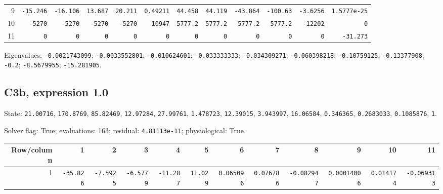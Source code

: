 \begin{landscape}
\begin{tabular}{rrrrrrrrrrrr}
9 & \texttt{-15.246} & \texttt{-16.106} & \texttt{13.687} & \texttt{20.211} & \texttt{0.49211} & \texttt{44.458} & \texttt{44.119} & \texttt{-43.864} & \texttt{-100.63} & \texttt{-3.6256} & \texttt{1.5777e-25} \\

10 & \texttt{-5270} & \texttt{-5270} & \texttt{-5270} & \texttt{-5270} & \texttt{10947} & \texttt{5777.2} & \texttt{5777.2} & \texttt{5777.2} & \texttt{5777.2} & \texttt{-12202} & \texttt{0} \\

11 & \texttt{0} & \texttt{0} & \texttt{0} & \texttt{0} & \texttt{0} & \texttt{0} & \texttt{0} & \texttt{0} & \texttt{0} & \texttt{0} & \texttt{-31.273} \\

\bottomrule\end{tabular}\par\endgroup

{\scriptsize Eigenvalues: \texttt{-0.0021743099}; \texttt{-0.0033552801}; \texttt{-0.010624601}; \texttt{-0.033333333}; \texttt{-0.034309271}; \texttt{-0.060398218}; \texttt{-0.10759125}; \texttt{-0.13377908}; \texttt{-0.2}; \texttt{-8.5679955}; \texttt{-15.281905}.\par}

\subsection*{C3b, expression 1.0}
{\scriptsize State: \texttt{21.00716}, \texttt{170.8769}, \texttt{85.82469}, \texttt{12.97284}, \texttt{27.99761}, \texttt{1.478723}, \texttt{12.39015}, \texttt{3.943997}, \texttt{16.06584}, \texttt{0.346365}, \texttt{0.2683033}, \texttt{0.1085876}, \texttt{1}.\par

Solver flag: True; evaluations: 163; residual: \texttt{4.81113e-11}; physiological: True.\par}

\begingroup\scriptsize\setlength{\tabcolsep}{3pt}\centering
\begin{tabular}{rrrrrrrrrrrr}\toprule

Row/column & 1 & 2 & 3 & 4 & 5 & 6 & 7 & 8 & 9 & 10 & 11 \\ \midrule

1 & \texttt{-35.826} & \texttt{-7.5925} & \texttt{-6.5779} & \texttt{-11.287} & \texttt{11.029} & \texttt{0.065096} & \texttt{0.076786} & \texttt{-0.082947} & \texttt{0.00014006} & \texttt{0.014174} & \texttt{-0.069313} \\


\end{tabular}
\end{landscape}
